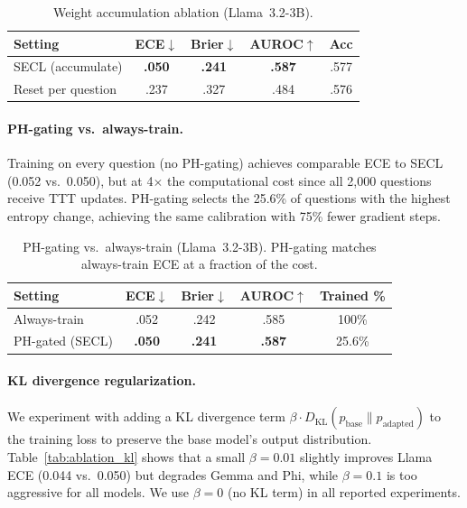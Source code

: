 \begin{table}[h]
\centering
\caption{Weight accumulation ablation (Llama~3.2-3B).}
\label{tab:ablation_accum}
\small
\begin{tabular}{@{}lcccc@{}}
\toprule
\textbf{Setting}
  & \textbf{ECE}$\downarrow$ & \textbf{Brier}$\downarrow$
  & \textbf{AUROC}$\uparrow$ & \textbf{Acc} \\
\midrule
SECL (accumulate)  & \textbf{.050} & \textbf{.241} & \textbf{.587} & .577 \\
Reset per question & .237 & .327 & .484 & .576 \\
\bottomrule
\end{tabular}
\end{table}

\paragraph{PH-gating vs.\ always-train.}
Training on every question (no PH-gating) achieves comparable ECE
to SECL (0.052 vs.\ 0.050), but at 4$\times$ the computational cost
since all 2{,}000 questions receive TTT updates.
PH-gating selects the 25.6\% of questions with the highest
entropy change, achieving the same calibration with 75\% fewer
gradient steps.

\begin{table}[h]
\centering
\caption{PH-gating vs.\ always-train (Llama~3.2-3B).
PH-gating matches always-train ECE at a fraction of the cost.}
\label{tab:ablation_phgate}
\small
\begin{tabular}{@{}lcccc@{}}
\toprule
\textbf{Setting}
  & \textbf{ECE}$\downarrow$ & \textbf{Brier}$\downarrow$
  & \textbf{AUROC}$\uparrow$ & \textbf{Trained \%} \\
\midrule
Always-train   & .052 & .242 & .585 & 100\% \\
PH-gated (SECL) & \textbf{.050} & \textbf{.241} & \textbf{.587} & 25.6\% \\
\bottomrule
\end{tabular}
\end{table}

\paragraph{KL divergence regularization.}
We experiment with adding a KL divergence term
$\beta \cdot D_{\text{KL}}(p_{\text{base}} \| p_{\text{adapted}})$
to the training loss to preserve the base model's output distribution.
Table~\ref{tab:ablation_kl} shows that a small $\beta{=}0.01$ slightly
improves Llama ECE (0.044 vs.\ 0.050) but degrades Gemma and Phi,
while $\beta{=}0.1$ is too aggressive for all models.
We use $\beta{=}0$ (no KL term) in all reported experiments.

